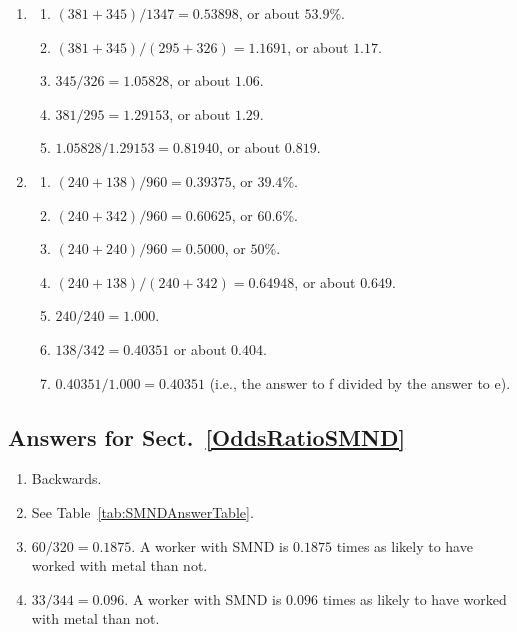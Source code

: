\documentclass[
  11pt,
  a4paper,
  krantz2]{krantz}
\providecommand{\tightlist}{%
  \setlength{\itemsep}{0pt}\setlength{\parskip}{0pt}}
\begin{document}
\begin{footnotesize}
\begin{enumerate}
\def\labelenumi{\arabic{enumi}.}
\tightlist
\item
  \begin{enumerate}
  \def\labelenumii{\alph{enumii}.}
  \tightlist
  \item
    \((381 + 345)/1347 = 0.53898\), or about \(53.9\)\%.
  \item
    \((381 + 345)/(295 + 326) = 1.1691\), or about \(1.17\).
  \item
    \(345/326 = 1.05828\), or about \(1.06\).
  \item
    \(381/295 = 1.29153\), or about \(1.29\).
  \item
    \(1.05828 / 1.29153 = 0.81940\), or about \(0.819\).
  \end{enumerate}
\item
  \begin{enumerate}
  \def\labelenumii{\alph{enumii}.}
  \tightlist
  \item
    \((240 + 138)/960 = 0.39375\), or \(39.4\)\%.
  \item
    \((240 + 342)/960 = 0.60625\), or \(60.6\)\%.
  \item
    \((240 + 240)/960 = 0.5000\), or \(50\)\%.
  \item
    \((240 + 138)/(240 + 342) = 0.64948\), or about \(0.649\).
  \item
    \(240/240 = 1.000\).
  \item
    \(138/342 = 0.40351\) or about \(0.404\).
  \item
    \(0.40351/ 1.000 = 0.40351\) (i.e., the answer to f divided by the answer to e).
  \end{enumerate}
\end{enumerate}

\subsection*{Answers for Sect.~\ref{OddsRatioSMND}}\label{answers-for-sect.-refoddsratiosmnd}

\begin{enumerate}
\def\labelenumi{\arabic{enumi}.}
\tightlist
\item
  Backwards.
\item
  See Table~\ref{tab:SMNDAnswerTable}.
\item
  \(60/320 = 0.1875\). A worker with SMND is \(0.1875\) times as likely to have worked with metal than not.
\item
  \(33/344 = 0.096\). A worker with SMND is \(0.096\) times as likely to have worked with metal than not.
\end{enumerate}


\end{footnotesize}
\end{document}
